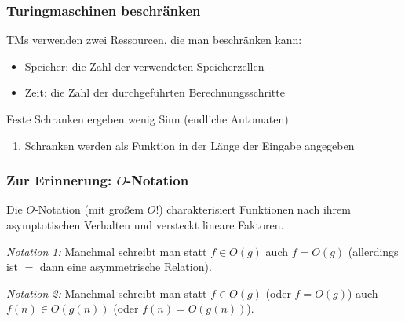 \documentclass[aspectratio=1610,onlymath]{beamer}
\begin{document}
\begin{frame}\frametitle{Turingmaschinen beschränken}

TMs verwenden zwei Ressourcen, die man beschränken kann:
\begin{itemize}
\item \alert{Speicher:} die Zahl der verwendeten Speicherzellen
\item \alert{Zeit:} die Zahl der durchgeführten Berechnungsschritte
\end{itemize}\pause
Feste Schranken ergeben wenig Sinn (endliche Automaten)\\
\begin{enumerate}[$\leadsto$]
\item Schranken werden als Funktion in der Länge der Eingabe angegeben
\end{enumerate}
\bigskip


\end{frame}

\begin{frame}\frametitle{Zur Erinnerung: $O$-Notation}

Die $O$-Notation (mit großem $O$!) charakterisiert Funktionen nach ihrem asymptotischen Verhalten und
versteckt lineare Faktoren.

\pause

\emph{Notation 1:} Manchmal schreibt man statt $f\in O(g)$ auch $f=O(g)$ (allerdings ist $=$ dann eine
asymmetrische Relation).\medskip

\emph{Notation 2:} Manchmal schreibt man statt $f\in O(g)$ (oder $f=O(g)$) auch $f(n)\in O(g(n))$ (oder $f(n)=O(g(n))$).


\end{frame}
\end{document}
